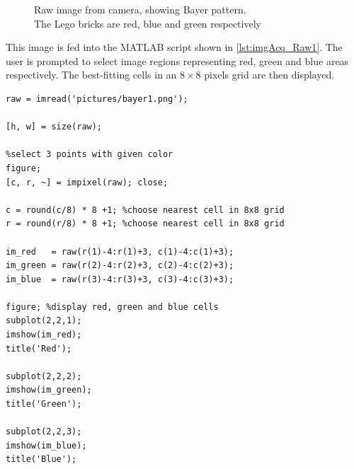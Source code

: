 \documentclass[
a4paper,     %
11pt         %
]{scrartcl}  %
\begin{document}
\begin{figure}[ht]\centering
{}
\caption{Raw image from camera, showing Bayer pattern.\\ The Lego bricks are red, blue and green respectively}\label{fig:imgAcq_Raw}
\end{figure}

This image is fed into the MATLAB script shown in \cref{lst:imgAcq_Raw1}. The user is prompted to select image regions representing red, green and blue areas respectively. The best-fitting cells in an $8 \times 8$ pixels grid are then displayed.

\begin{lstlisting}[float,floatplacement=h!,label=lst:imgAcq_Raw1, caption=Matlab script to show bayer pattern of acquired image]
raw = imread('pictures/bayer1.png');

[h, w] = size(raw);

%select 3 points with given color
figure;
[c, r, ~] = impixel(raw); close;

c = round(c/8) * 8 +1; %choose nearest cell in 8x8 grid
r = round(r/8) * 8 +1; %choose nearest cell in 8x8 grid

im_red   = raw(r(1)-4:r(1)+3, c(1)-4:c(1)+3);
im_green = raw(r(2)-4:r(2)+3, c(2)-4:c(2)+3);
im_blue  = raw(r(3)-4:r(3)+3, c(3)-4:c(3)+3);

figure; %display red, green and blue cells
subplot(2,2,1);
imshow(im_red);
title('Red');

subplot(2,2,2);
imshow(im_green);
title('Green');

subplot(2,2,3);
imshow(im_blue);
title('Blue');
\end{lstlisting}
\end{document}
